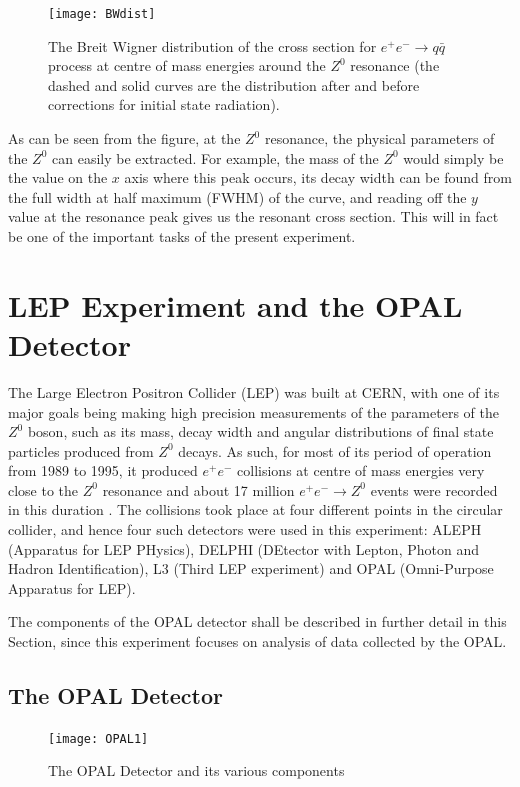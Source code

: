 \begin{figure}[H]
\centering
\texttt{[image: BWdist]}
\caption[Breit Wigner distribution of the cross section for $e^{+}e^{-}\rightarrow q\bar{q}$ process]{The Breit Wigner distribution of the cross section for $e^{+}e^{-}\rightarrow q\bar{q}$ process at centre of mass energies around the $Z^{0}$ resonance (the dashed and solid curves are the distribution after and before corrections for initial state radiation). \cite{thomson_2013}}
\label{fig:BWdist}
\end{figure}
As can be seen from the figure, at the $Z^{0}$ resonance, the physical parameters of the $Z^{0}$ can easily be extracted. For example, the mass of the $Z^{0}$ would simply be the value on the $x$ axis where this peak occurs, its decay width can be found from the full width at half maximum (FWHM) of the curve, and reading off the $y$ value at the resonance peak gives us the resonant cross section. This will in fact be one of the important tasks of the present experiment.

\section{LEP Experiment and the OPAL Detector}
The Large Electron Positron Collider (LEP) was built at CERN, with one of its major goals being making high precision measurements of the parameters of the $Z^{0}$ boson, such as its mass, decay width and angular distributions of final state particles produced from $Z^{0}$ decays. As such, for most of its period of operation from 1989 to 1995, it produced $e^{+}e^{-}$ collisions at centre of mass energies very close to the $Z^{0}$ resonance and about 17 million $e^{+}e^{-}\rightarrow Z^{0}$ events were recorded in this duration \cite{thomson_2013}. The collisions took place at four different points in the circular collider, and hence four such detectors were used in this experiment: ALEPH (Apparatus for LEP PHysics), DELPHI (DEtector with Lepton, Photon and Hadron Identification), L3 (Third LEP experiment) and OPAL (Omni-Purpose Apparatus for LEP). 

The components of the OPAL detector shall be described in further detail in this Section, since this experiment focuses on analysis of data collected by the OPAL.

\subsection{The OPAL Detector}
\begin{figure}[H]
\centering
\texttt{[image: OPAL1]}
\caption[The OPAL Detector and its various components]{The OPAL Detector and its various components \cite{OPAL}}
\label{fig:OPAL}
\end{figure}

